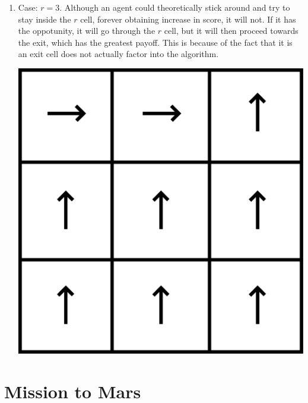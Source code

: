 \documentclass[11pt]{article}
\begin{document}
\begin{enumerate}
\item Case: $r = 3$. Although an agent could theoretically stick around and try to stay inside the $r$ cell, forever obtaining increase in score, it will not. If it has the oppotunity, it will go through the $r$ cell, but it will then proceed towards the exit, which has the greatest payoff. This is because of the fact that it is an exit cell does not actually factor into the algorithm.

\begin{center}
\includegraphics[scale=0.25]{3.png}
\end{center}

\end{enumerate}

\section{Mission to Mars}
\end{document}
